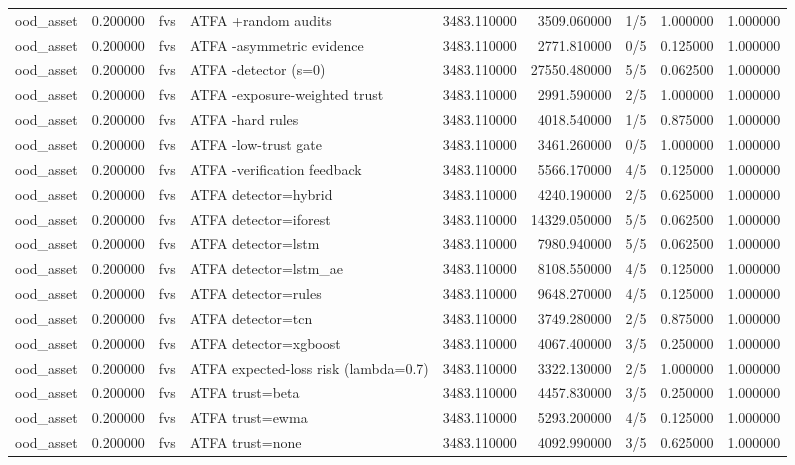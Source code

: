 \begin{tabular}{lrllrrlrr}
ood\_asset & 0.200000 & fvs & ATFA +random audits & 3483.110000 & 3509.060000 & 1/5 & 1.000000 & 1.000000 \\
ood\_asset & 0.200000 & fvs & ATFA -asymmetric evidence & 3483.110000 & 2771.810000 & 0/5 & 0.125000 & 1.000000 \\
ood\_asset & 0.200000 & fvs & ATFA -detector (s=0) & 3483.110000 & 27550.480000 & 5/5 & 0.062500 & 1.000000 \\
ood\_asset & 0.200000 & fvs & ATFA -exposure-weighted trust & 3483.110000 & 2991.590000 & 2/5 & 1.000000 & 1.000000 \\
ood\_asset & 0.200000 & fvs & ATFA -hard rules & 3483.110000 & 4018.540000 & 1/5 & 0.875000 & 1.000000 \\
ood\_asset & 0.200000 & fvs & ATFA -low-trust gate & 3483.110000 & 3461.260000 & 0/5 & 1.000000 & 1.000000 \\
ood\_asset & 0.200000 & fvs & ATFA -verification feedback & 3483.110000 & 5566.170000 & 4/5 & 0.125000 & 1.000000 \\
ood\_asset & 0.200000 & fvs & ATFA detector=hybrid & 3483.110000 & 4240.190000 & 2/5 & 0.625000 & 1.000000 \\
ood\_asset & 0.200000 & fvs & ATFA detector=iforest & 3483.110000 & 14329.050000 & 5/5 & 0.062500 & 1.000000 \\
ood\_asset & 0.200000 & fvs & ATFA detector=lstm & 3483.110000 & 7980.940000 & 5/5 & 0.062500 & 1.000000 \\
ood\_asset & 0.200000 & fvs & ATFA detector=lstm\_ae & 3483.110000 & 8108.550000 & 4/5 & 0.125000 & 1.000000 \\
ood\_asset & 0.200000 & fvs & ATFA detector=rules & 3483.110000 & 9648.270000 & 4/5 & 0.125000 & 1.000000 \\
ood\_asset & 0.200000 & fvs & ATFA detector=tcn & 3483.110000 & 3749.280000 & 2/5 & 0.875000 & 1.000000 \\
ood\_asset & 0.200000 & fvs & ATFA detector=xgboost & 3483.110000 & 4067.400000 & 3/5 & 0.250000 & 1.000000 \\
ood\_asset & 0.200000 & fvs & ATFA expected-loss risk (lambda=0.7) & 3483.110000 & 3322.130000 & 2/5 & 1.000000 & 1.000000 \\
ood\_asset & 0.200000 & fvs & ATFA trust=beta & 3483.110000 & 4457.830000 & 3/5 & 0.250000 & 1.000000 \\
ood\_asset & 0.200000 & fvs & ATFA trust=ewma & 3483.110000 & 5293.200000 & 4/5 & 0.125000 & 1.000000 \\
ood\_asset & 0.200000 & fvs & ATFA trust=none & 3483.110000 & 4092.990000 & 3/5 & 0.625000 & 1.000000 \\

\end{tabular}
